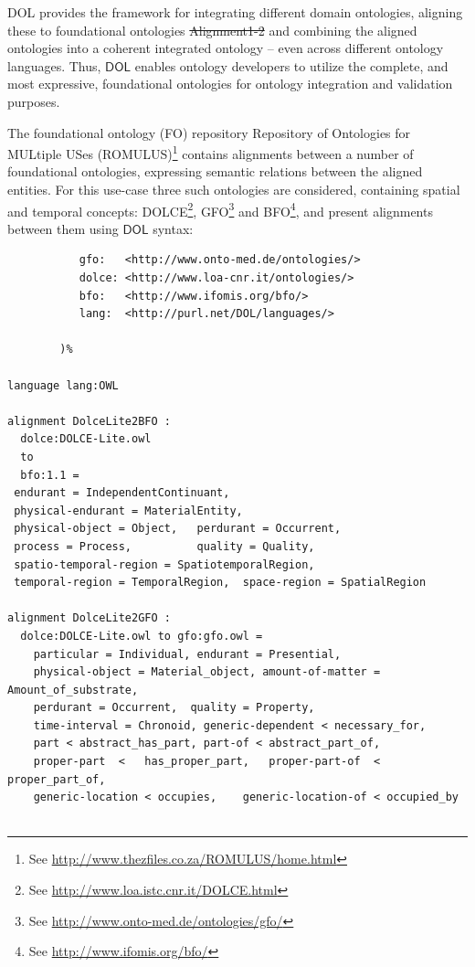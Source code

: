 \documentclass[10pt,fleqn,final]{scrreprt}
\newcommand*{\DOL}{\ensuremath{\mathsf{DOL}}\xspace}
\newenvironment{definitions}[0]{\medskip }{}
\providecommand{\DIFadd}[1]{{\protect\color{blue}\uwave{#1}}} %
\providecommand{\DIFdel}[1]{{\protect\color{red}\sout{#1}}}                      %
\providecommand{\DIFaddbegin}{} %
\providecommand{\DIFaddend}{} %
\providecommand{\DIFdelbegin}{} %
\providecommand{\DIFdelend}{} %
\begin{document}
\begin{definitions}
DOL  provides the framework for integrating different domain ontologies, aligning these to 
foundational ontologies \DIFdelbegin %
\DIFdel{Alignment1-2}%
\DIFdelend \DIFaddbegin \DIFadd{\mbox{%
\cite{DBLP:books/daglib/0032976,AlignmentAPI}
}%
}\DIFaddend and combining the aligned ontologies into a coherent 
integrated ontology -- even across different ontology languages. Thus, \DOL  enables ontology 
developers to utilize the complete, and most expressive, foundational ontologies for ontology 
integration and validation purposes. 

The foundational ontology (FO) repository Repository of Ontologies for MULtiple USes (ROMULUS)\footnote{See \url{http://www.thezfiles.co.za/ROMULUS/home.html}}
contains alignments between a number of foundational ontologies, expressing semantic relations between the aligned
entities.  For this use-case three such ontologies are considered, containing spatial and temporal concepts: DOLCE\footnote{See \url{http://www.loa.istc.cnr.it/DOLCE.html}}, GFO\footnote{See \url{http://www.onto-med.de/ontologies/gfo/}} and BFO\footnote{See \url{http://www.ifomis.org/bfo/}}, and present alignments between them 
using \DOL syntax:

\begin{lstlisting}[basicstyle=\ttfamily\footnotesize,language=dolText,escapechar=@,mathescape]
%prefix(
           gfo:   <http://www.onto-med.de/ontologies/>
           dolce: <http://www.loa-cnr.it/ontologies/>
           bfo:   <http://www.ifomis.org/bfo/>
           lang:  <http://purl.net/DOL/languages/>

        )%

language lang:OWL

alignment DolceLite2BFO :
  dolce:DOLCE-Lite.owl
  to
  bfo:1.1 =
 endurant = IndependentContinuant,
 physical-endurant = MaterialEntity,
 physical-object = Object,   perdurant = Occurrent,
 process = Process,          quality = Quality,
 spatio-temporal-region = SpatiotemporalRegion,
 temporal-region = TemporalRegion,  space-region = SpatialRegion

alignment DolceLite2GFO :
  dolce:DOLCE-Lite.owl to gfo:gfo.owl =
 	particular = Individual, endurant = Presential,
 	physical-object = Material_object, amount-of-matter = Amount_of_substrate,
 	perdurant = Occurrent, 	quality = Property,
 	time-interval = Chronoid, generic-dependent < necessary_for,
 	part < abstract_has_part, part-of < abstract_part_of,
 	proper-part  <	 has_proper_part,  	proper-part-of  < proper_part_of,
 	generic-location < occupies, 	generic-location-of < occupied_by


\end{lstlisting}
\end{definitions}
\end{document}

